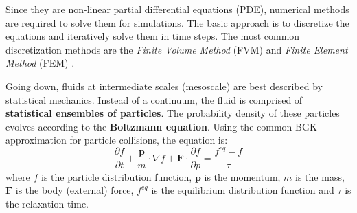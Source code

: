 \documentclass[conference]{IEEEtran}
\begin{document}
Since they are non-linear partial differential equations (PDE), numerical methods are required to solve them for simulations.
The basic approach is to discretize the equations and iteratively solve them in time steps.
The most common discretization methods are the \emph{Finite Volume Method} (FVM) and \emph{Finite Element Method} (FEM) \cite{blazek2015computational}.

Going down, fluids at intermediate scales (mesoscale) are best described by statistical mechanics. Instead of a continuum, the fluid is comprised of \textbf{statistical ensembles of particles}.
The probability density of these particles evolves according to the \textbf{Boltzmann equation}.
Using the common BGK approximation for particle collisions, the equation is:
\begin{displaymath}
    \label{eq:boltzmann}
    \frac{\partial f}{\partial t} + \frac{\pmb{p}}{m} \cdot \nabla f + \pmb{F} \cdot \frac{\partial f}{\partial p} = \frac{f^{eq} - f}{\tau}
\end{displaymath}
where $f$ is the particle distribution function, $\pmb{p}$ is the momentum, $m$ is the mass, $\pmb{F}$ is the body (external) force, $f^{eq}$ is the equilibrium distribution function and $\tau$ is the relaxation time.
\end{document}
